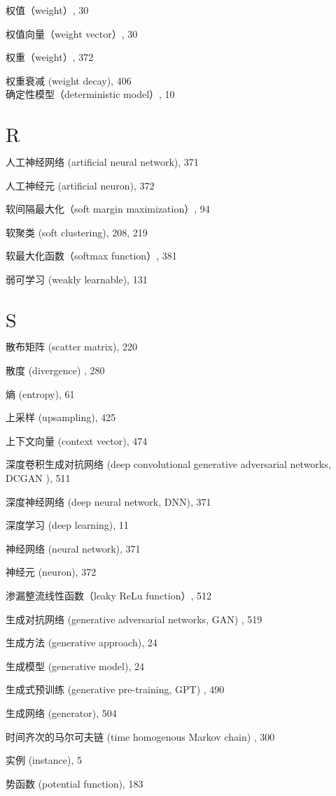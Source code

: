\documentclass[10pt]{article}
\begin{document}
权值（weight）, 30

权值向量（weight vector）, 30

权重（weight）, 372

权重衰减 (weight decay), 406\\
确定性模型（deterministic model）, 10

\section*{$\mathrm{R}$}
人工神经网络 (artificial neural network), 371

人工神经元 (artificial neuron), 372

软间隔最大化（soft margin maximization）, 94

软聚类 (soft clustering), 208, 219

软最大化函数（softmax function）, 381

弱可学习 (weakly learnable), 131

\section*{$\mathrm{S}$}
散布矩阵 (scatter matrix), 220

散度 (divergence) , 280

熵 (entropy), 61

上采样 (upsampling), 425

上下文向量 (context vector), 474

深度卷积生成对抗网络 (deep convolutional generative adversarial networks, DCGAN ), 511

深度神经网络 (deep neural network, DNN), 371

深度学习 (deep learning), 11

神经网络 (neural network), 371

神经元 (neuron), 372

渗漏整流线性函数（leaky ReLu function）, 512

生成对抗网络 (generative adversarial networks, GAN) , 519

生成方法 (generative approach), 24

生成模型 (generative model), 24

生成式预训练 (generative pre-training, GPT) , 490

生成网络 (generator), 504

时间齐次的马尔可夫链 (time homogenous Markov chain) , 300

实例 (instance), 5

势函数 (potential function), 183
\end{document}
